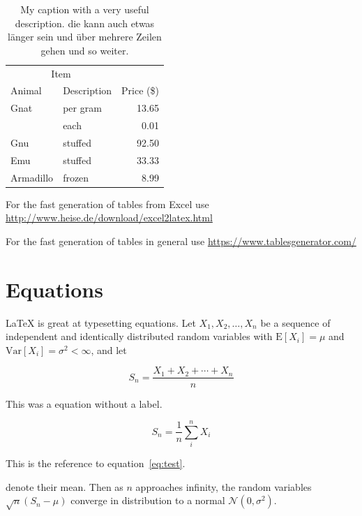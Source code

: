 \begin{table}[ht!]
  \caption{My caption with a very useful description. die kann auch etwas länger sein und über mehrere Zeilen gehen und so weiter.}
  \label{my-label}
  \begin{tabular}{llr}
    \hline
    \multicolumn{2}{c}{Item} &            \\ \cline{1-2}
    Animal     & Description & Price (\$) \\ \hline
    Gnat       & per gram    & 13.65      \\
               & each        & 0.01       \\
    Gnu        & stuffed     & 92.50      \\
    Emu        & stuffed     & 33.33      \\
    Armadillo  & frozen      & 8.99       \\ \hline
  \end{tabular}
\end{table}

For the fast generation of tables from Excel use \url{http://www.heise.de/download/excel2latex.html}

For the fast generation of tables in general use
\url{https://www.tablesgenerator.com/}

\section{Equations}

\LaTeX{} is great at typesetting equations. Let $X_1, X_2, \ldots, X_n$ be a sequence of independent and identically distributed random variables with $\text{E}[X_i] = \mu$ and $\text{Var}[X_i] = \sigma^2 < \infty$, and let

$$S_n = \frac{X_1 + X_2 + \cdots + X_n}{n}$$

This was a equation without a label.
      
\begin{equation}
S_n = \frac{1}{n}\sum_{i}^{n} X_i
\label{eq:test}
\end{equation}


This is the reference to equation~\ref{eq:test}.      


denote their mean. Then as $n$ approaches infinity, the random variables $\sqrt{n}(S_n - \mu)$ converge in distribution to a normal $\mathcal{N}(0, \sigma^2)$.


